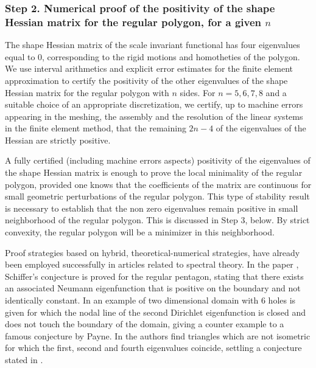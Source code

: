 \documentclass[11pt]{article}
\numberwithin{equation}{section}\newtheorem*{jepEnonce}{\jepEnonceTitle}\newenvironment{enonce*}[1]{\def\jepEnonceTitle{#1}\jepEnonce}{\endjepEnonce}\newtheorem*{conj*}{Conjecture}
\theoremstyle{plain}
\theoremstyle{definition}
\begin{document}
\subsubsection*{Step 2. Numerical proof of the positivity of the shape Hessian matrix for the regular polygon, for a given $n$}
The shape Hessian matrix of the scale invariant functional has four eigenvalues equal to $0$, corresponding to the rigid motions and homotheties of the polygon.
We use interval arithmetics and explicit error estimates for the finite element approximation to certify the positivity of the other eigenvalues of the shape Hessian matrix for the regular polygon with $n$ sides. For $n=5,6,7,8$ and a suitable choice of an appropriate discretization, we certify, up to machine errors appearing in the meshing, the assembly and the resolution of the linear systems in the finite element method, that the remaining $2n-4$ of the eigenvalues of the Hessian are strictly positive.

A fully certified (including machine errors aspects) positivity of the eigenvalues of the shape Hessian matrix is enough to prove the local minimality of the regular polygon, provided one knows that the coefficients of the matrix are continuous for small geometric perturbations of the regular polygon. This type of stability result is necessary to establish that the non zero eigenvalues remain positive in small neighborhood of the regular polygon. This is discussed in Step 3, below. By strict convexity, the regular polygon will be a minimizer in this neighborhood.

{Proof strategies based on hybrid, theoretical-numerical strategies, have already been employed successfully in articles related to spectral theory. In the paper \cite{schiffer}, Schiffer's conjecture is proved for the regular pentagon, stating that there exists an associated Neumann eigenfunction that is positive on the boundary and not identically constant. In \cite{dahne-payne} an example of two dimensional domain with $6$ holes is given for which the nodal line of the second Dirichlet eigenfunction is closed and does not touch the boundary of the domain, giving a counter example to a famous conjecture by Payne. In \cite{three_eigs_triangle} the authors find triangles which are not isometric for which the first, second and fourth eigenvalues coincide, settling a conjecture stated in \cite{AFpolygons}.}
\end{document}
